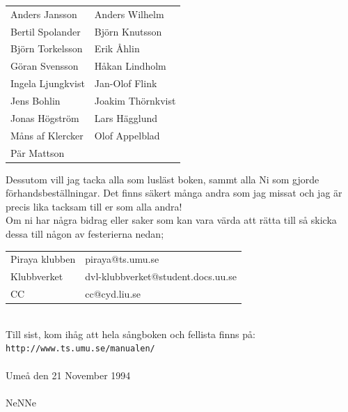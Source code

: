 \documentclass[a6paper,fontsize=10pt,twoside,openright]{scrbook}
\newcommand*\cleartoleftpage{%
  \clearpage
  \ifodd\value{page}\hbox{}\newpage\fi
}
\begin{document}
\noindent
\begin{tabular}{@{}p{}p{}@{}}
  Anders Jansson & Anders Wilhelm\\
  Bertil Spolander & Björn Knutsson\\
  Björn Torkelsson & Erik Åhlin\\
  Göran Svensson & Håkan Lindholm\\
  Ingela Ljungkvist & Jan-Olof Flink\\
  Jens Bohlin & Joakim Thörnkvist\\
  Jonas Högström & Lars Hägglund\\
  Måns af Klercker & Olof Appelblad\\
  Pär Mattson
\end{tabular}
\newpage
\indent Dessutom vill jag tacka alla som lusläst boken, sammt alla Ni
som gjorde förhandsbeställningar. Det finns säkert många andra som jag
missat och jag är precis lika tacksam till er som alla
andra!\\ \indent Om ni har några bidrag eller saker som kan vara värda
att rätta till så skicka dessa till någon av festerierna nedan;\\

\noindent
\begin{tabular}{@{}p{}p{}@{}}
  Piraya klubben & piraya@ts.umu.se\\
  Klubbverket & dvl-klubbverket@student.docs.uu.se\\
  CC & cc@cyd.liu.se
\end{tabular}\\

\indent Till sist, kom ihåg att hela sångboken och fellista finns på:
\texttt{http://www.ts.umu.se/\raisebox{.4ex}\texttildelow manualen/}\\ \\ Umeå den 21 November
1994\\ \\ NeNNe
\cleartoleftpage
\end{document}
